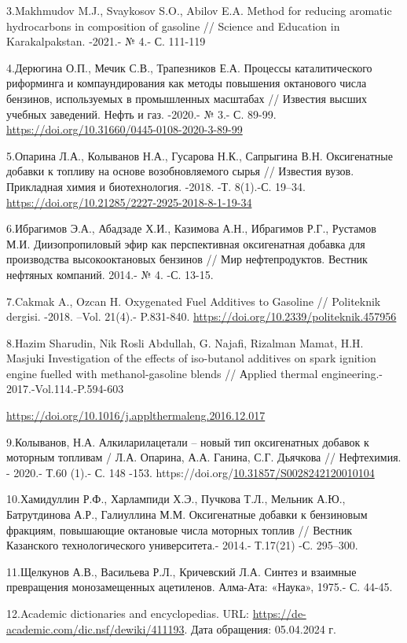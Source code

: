3.Makhmudov M.J., Svaykosov S.O., Abilov E.A. Method for reducing
aromatic hydrocarbons in composition of gasoline // Science and
Education in Karakalpakstan. -2021.- № 4.- С. 111-119

4.Дерюгина О.П., Мечик С.В., Трапезников Е.А. Процессы каталитического
риформинга и компаундирования как методы повышения октанового числа
бензинов, используемых в промышленных масштабах // Известия высших
учебных заведений. Нефть и газ. -2020.- № 3.- С. 89-99.
\url{https://doi.org/10.31660/0445-0108-2020-3-89-99}

5.Опарина Л.А., Колыванов Н.А., Гусарова Н.К., Сапрыгина В.Н.
Оксигенатные добавки к топливу на основе возобновляемого сырья //
Известия вузов. Прикладная химия и биотехнология. -2018. -Т. 8(1).-С.
19--34. \url{https://doi.org/10.21285/2227-2925-2018-8-1-19-34}

6.Ибрагимов Э.А., Абадзаде Х.И., Казимова А.Н., Ибрагимов Р.Г., Рустамов
М.И. Диизопропиловый эфир как перспективная оксигенатная добавка для
производства высокооктановых бензинов // Мир нефтепродуктов. Вестник
нефтяных компаний. 2014.- № 4. -С. 13-15.

7.Cakmak A., Ozcan H. Oxygenated Fuel Additives to Gasoline //
Politeknik dergisi. -2018. --Vol. 21(4).- P.831-840.
\url{https://doi.org/10.2339/politeknik.457956}

8.Hazim Sharudin, Nik Rosli Abdullah, G. Najafi, Rizalman Mamat, H.H.
Masjuki Investigation of the effects of iso-butanol additives on spark
ignition engine fuelled with methanol-gasoline blends // Аpplied thermal
engineering.- 2017.-Vol.114.-P.594-603

\url{https://doi.org/10.1016/j.applthermaleng.2016.12.017}

9.Колыванов, Н.А. Алкиларилацетали -- новый тип оксигенатных добавок к
моторным топливам / Л.А. Опарина, А.А. Ганина, С.Г. Дьячкова //
Нефтехимия. - 2020.- Т.60 (1).- С. 148 -153.
https://doi.org/\href{https://doi.org/10.31857/S0028242120010104}{10.31857/S0028242120010104}

10.Хамидуллин Р.Ф., Харлампиди Х.Э., Пучкова Т.Л., Мельник А.Ю.,
Батрутдинова А.Р., Галиуллина М.М. Оксигенатные добавки к бензиновым
фракциям, повышающие октановые числа моторных топлив // Вестник
Казанского технологического университета.- 2014.- Т.17(21) -С. 295--300.

11.Щелкунов А.В., Васильева Р.Л., Кричевский Л.А. Синтез и взаимные
превращения монозамещенных ацетиленов. Алма-Ата: «Наука», 1975.- С.
44-45.

12.Academic dictionaries and encyclopedias. URL:
\url{https://de-academic.com/dic.nsf/dewiki/411193}. Дата обращения:
05.04.2024 г.

